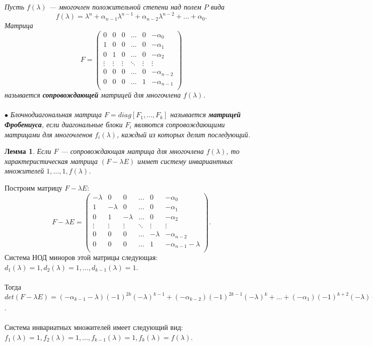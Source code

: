 \textit{Пусть $f(\lambda)$ --- многочлен положительной степени над полем $P$ вида} $$f(\lambda) = \lambda^n + \alpha_{n-1}\lambda^{n-1} + \alpha_{n-2}\lambda^{n-2} + \ldots + \alpha_0.$$ \textit{Матрица}
$$F = \begin{pmatrix}
	0 & 0 & 0 & \dots & 0 & -\alpha_0\\
	1 & 0 & 0 & \dots & 0 & -\alpha_1\\
	0 & 1 & 0 & \dots & 0 & -\alpha_2\\
	\vdots & \vdots & \vdots & \ddots & \vdots & \vdots\\
	0 & 0 & 0 & \dots & 0 & -\alpha_{n-2}\\
	0 & 0 & 0 & \dots & 1 & -\alpha_{n-1}\\
\end{pmatrix}$$ \textit{называется \textbf{сопровождающей} матрицей для многочлена $f(\lambda)$.}\\\\
$\bullet$ \textit{Блочнодиагональная матрица $F = diag[F_1,\dots,F_k]$ называется \textbf{матрицей Фробениуса}, если диагональные блоки $F_i$ являются сопровождающими матрицами для многочленов $f_i(\lambda)$, каждый из которых делит последующий.}
\newtheorem*{lem12_11}{Лемма}\begin{lem12_11}Если $F$ --- сопровождающая матрица для многочлена $f(\lambda)$, то характеристическая матрица $(F-\lambda E)$ иммет систему инвариантных множителей $1,\ldots,1, f(\lambda)$.
\end{lem12_11}\begin{Proof}
	Построим матрицу $F-\lambda E$:\\
	$$F-\lambda E = \begin{pmatrix}
		-\lambda & 0 & 0 & \dots & 0 & -\alpha_0\\
		1 & -\lambda & 0 & \dots & 0 & -\alpha_1\\
		0 & 1 & -\lambda & \dots & 0 & -\alpha_2\\
		\vdots & \vdots & \vdots & \ddots & \vdots & \vdots\\
		0 & 0 & 0 & \dots & -\lambda & -\alpha_{n-2}\\
		0 & 0 & 0 & \dots & 1 & -\alpha_{n-1} - \lambda\\
	\end{pmatrix}.$$
	Система НОД миноров этой матрицы следующая: $d_1(\lambda) = 1, d_2(\lambda) = 1, \dots, d_{k-1}(\lambda) = 1$.\\\\
	Тогда $det (F-\lambda E) = (-\alpha_{k-1} - \lambda)(-1)^{2k}(-\lambda)^{k-1} + (-\alpha_{k-2})(-1)^{2k-1}(-\lambda)^{k} + \ldots + (-\alpha_{1} )(-1)^{k+2}(-\lambda)+(-\alpha_{0})(-1)^{k+1} =(-1)^k(\lambda^k + \alpha_{n-1}\lambda^{n-1} + \alpha_{n-2}\lambda^{n-2} + \ldots + \alpha_1\lambda + \alpha_0)= (-1)^kf(\lambda)$.\\\\
	Система инвариатных множителей имеет следующий вид: $f_1(\lambda) = 1, f_2(\lambda) = 1,\dots, f_{k-1}(\lambda) = 1, f_k(\lambda) = f(\lambda)$.
\end{Proof}
